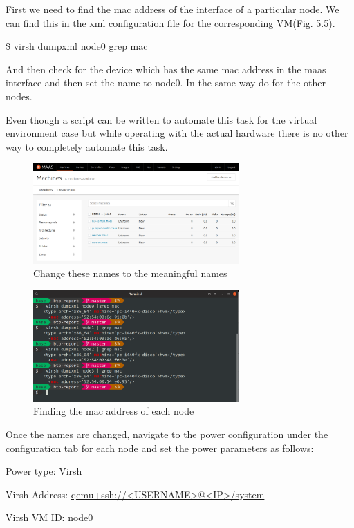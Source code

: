 First we need to find the mac address of the interface of a particular node. We can find this in the xml configuration file for the corresponding VM(Fig. 5.5).

\$ virsh dumpxml node0 \textbar grep mac

And then check for the device which has the same mac address in the maas interface and then set the name to node0. In the same way do for the other nodes.

Even though a script can be written to automate this task for the virtual environment case but while operating with the actual hardware there is no other way to completely automate this task.

\begin{figure}[!ht]
    \centering
    \includegraphics[width=0.7\textwidth]{images/5-4.png}
    \caption{Change these names to the meaningful names}
\end{figure}

\begin{figure}[!ht]
    \centering
    \includegraphics[width=0.7\textwidth]{images/5-5.png}
    \caption{Finding the mac address of each node}
\end{figure}

Once the names are changed, navigate to the power configuration under the configuration tab for each node and set the power parameters as follows:

Power type: Virsh

Virsh Address: \url{qemu+ssh://<USERNAME>@<IP>/system}

Virsh VM ID: \url{node0}

